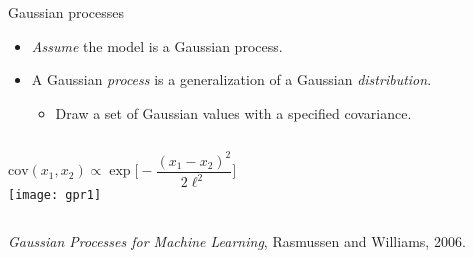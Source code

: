 \documentclass{beamer}
\begin{document}
\begin{frame}{Gaussian processes}

  \begin{itemize}
    \item \emph{Assume} the model is a Gaussian process.
    \item A Gaussian \emph{process} is a generalization of a Gaussian \emph{distribution}.
      \begin{itemize}
        \item Draw a set of Gaussian values with a specified covariance.
      \end{itemize}
  \end{itemize}

  \sms

  \begin{columns}[c]
      \begin{equation*}
        \text{cov}(x_1,x_2) \propto \exp \biggl[ -\frac{(x_1 - x_2)^2}{2\ell^2} \biggr]
      \end{equation*}
    \texttt{[image: gpr1]}
  \end{columns}

  \flushright\tiny \emph{Gaussian Processes for Machine Learning}, Rasmussen and Williams, 2006.
\end{frame}
\end{document}
